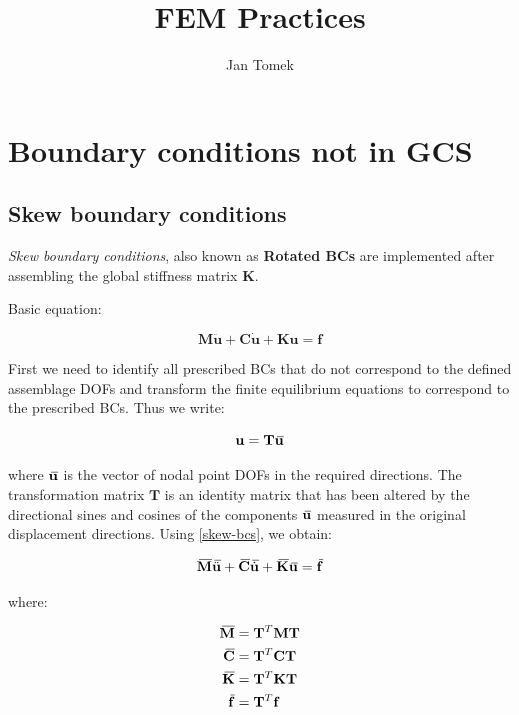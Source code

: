 \documentclass[10pt,b5paper,titlepage]{book}
\author{Jan Tomek}
\title{\bf FEM Practices}
\newcommand{\closure}[2][3]{%
{}\mkern#1mu\overline{\mkern-#1mu#2}}
\newenvironment{eqarray}
{
    \begin{eqnarray}
        \begin{aligned}
}
{
        \end{aligned}
    \end{eqnarray}
}
\begin{document}
\maketitle

\tableofcontents


\newpage
\chapter{Boundary conditions not in GCS}

\section{Skew boundary conditions}
\textit{Skew boundary conditions}, also known as \textbf{Rotated BCs} are implemented
after assembling the global stiffness matrix $ \mathbf{K} $.

Basic equation:

\begin{equation}
    \mathbf{M} \ddot{\mathbf{u}} + \mathbf{C} \dot{\mathbf{u}} + \mathbf{K} \mathbf{u}
    = \mathbf{f}
\end{equation}

First we need to identify all prescribed BCs that do not correspond to the
defined assemblage DOFs and transform the finite equilibrium equations to
correspond to the prescribed BCs. Thus we write:

\begin{equation}\label{skew-bcs}
    \mathbf{u} = \mathbf{T} \closure{\mathbf{u}}
\end{equation}

where $ \closure{\mathbf{u}} $ is the vector of nodal point DOFs in the required
directions. The transformation matrix $ \mathbf{T} $ is an identity matrix
that has been altered by the directional sines and cosines of the components
$ \closure{\mathbf{u}} $ measured in the original displacement directions.
Using \eqref{skew-bcs}, we obtain:

\begin{equation}
    \closure{\mathbf{M}} \closure{\ddot{\mathbf{u}}}
    + \closure{\mathbf{C}} \closure{\dot{\mathbf{u}}}
    + \closure{\mathbf{K}} \closure{\mathbf{u}}
    = \closure{\mathbf{f}}
\end{equation}

where:

\begin{eqarray}\label{skew-eq-of-motion}
    \closure{\mathbf{M}} & = \mathbf{T}^T \mathbf{M} \mathbf{T} \\
    \closure{\mathbf{C}} & = \mathbf{T}^T \mathbf{C} \mathbf{T} \\
    \closure{\mathbf{K}} & = \mathbf{T}^T \mathbf{K} \mathbf{T} \\
    \closure{\mathbf{f}} & = \mathbf{T}^T \mathbf{f}
\end{eqarray}
\end{document}
